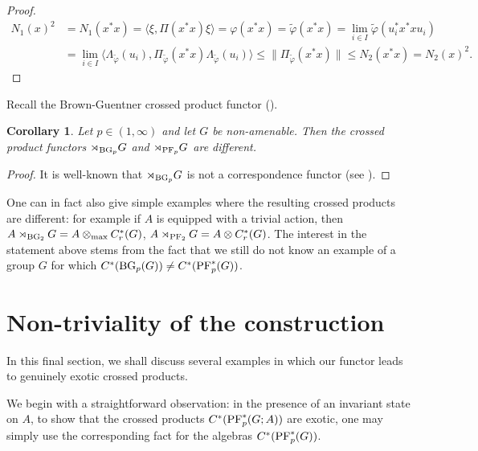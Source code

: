\documentclass[12pt]{amsart}
\newtheorem{cor}[thm]{Corollary}
\theoremstyle{definition}
\theoremstyle{remark}
\numberwithin{equation}{section}
\newcommand{\la}{\langle}
\newcommand{\ra}{\rangle}
\newcommand{\PF}[3]{\ensuremath{\mathrm{PF}_{#1}^*\left(#2; #3\right)}}
\begin{document}
\begin{proof}
	\[\begin{split}
N_1(x)^2&=N_1(x^*x)=\la \xi , \Pi(x^*x)\xi\ra=
\varphi(x^*x)=\tilde{\varphi}(x^*x)=
\lim_{i\in I} \tilde{\varphi}(u_i^* x^*x u_i)\\
&=
\lim_{i\in I} \la \Lambda_{\tilde{\varphi}}(u_i) , \Pi_{\tilde{\varphi}}(x^*x) \Lambda_{\tilde{\varphi}}(u_i)\ra \le 
\|\Pi_{\tilde{\varphi}}(x^*x)\| \le N_2(x^*x)=N_2(x)^2.
\end{split}\]	
\end{proof}


Recall the Brown-Guentner crossed product functor (\cite[Section 2.2]{BEW}).

\begin{cor}
Let $p \in (1, \infty)$ and let $G$ be non-amenable. Then the crossed product functors $\rtimes_{\textup{BG}_p}G$ and $\rtimes_{\textup{PF}_p}G$ are different.
\end{cor}
\begin{proof}
It is well-known that $\rtimes_{\textup{BG}_p}G$ is not a correspondence functor (see \cite[Remark 4.19]{BEW}).
\end{proof}

One can in fact also give simple examples where the resulting crossed products are different: for example if $A$ is equipped with a trivial action, then
$A \rtimes_{\textup{BG}_2} G = A \otimes_{\textup{max}} C^*_r(G)$, $A \rtimes_{\textup{PF}_2} G = A \otimes C^*_r(G)$. The interest in the statement above stems from the fact that we still do not know an example of a group $G$ for which $C^*(\textup{BG}_p(G)) \neq C^*(\textup{PF}^*_p(G))$.


\section{Non-triviality of the construction} \label{sec:examples}

In this final section, we shall discuss several examples in which our functor leads to genuinely exotic crossed products.

We begin with a straightforward observation: in the presence of an invariant state on $A$, to show that the crossed products $C^*(\textup{PF}^*_{p}(G;A))$ are exotic, one may simply use the corresponding fact for the algebras $C^*(\textup{PF}^*_p(G))$.
\end{document}
